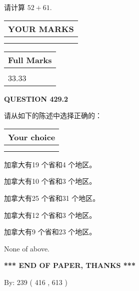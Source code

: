 \documentclass{ctexart}
\begin{document}
  
 
请计算 $ %
52 +  %
61 $.
 

 

 
  
\vspace{0.2in}
  
\noindent\begin{tabular}{|l|}
\hline
 YOUR MARKS  \\
\hline
 \\ 
 \\ 
\hline
\end{tabular}
\hspace{0.05in} \begin{tabular}{|l|}
\hline
 Full Marks  \\
\hline
 \\ 
33.33 \\
\hline
\end{tabular}
{\textbf{\Large{QUESTION
429.2 
}}}
  
  
请从如下的陈述中选择正确的：
  
  
\noindent\hspace{3.0in} \begin{tabular}{|l|}
\hline
Your choice \\
\hline
 \\ 
 \\ 
\hline
\end{tabular}
  
  
 
 
加拿大有19 个省和4 个地区。
 
 
加拿大有10 个省和3 个地区。
 
 
加拿大有25 个省和31 个地区。
 
 
加拿大有12 个省和3 个地区。
 
 
加拿大有9 个省和23 个地区。
 
 
 None of above.
 
 
   
   
 \vspace{0.2in}
 
   
   
   
   
\vspace{1.0in} 
{\textbf{\large{ *** END OF PAPER, THANKS *** }}} 
   
   
\hspace{1.0in} By: 
 239 ( 416 ,  613 )
   
\end{document}
